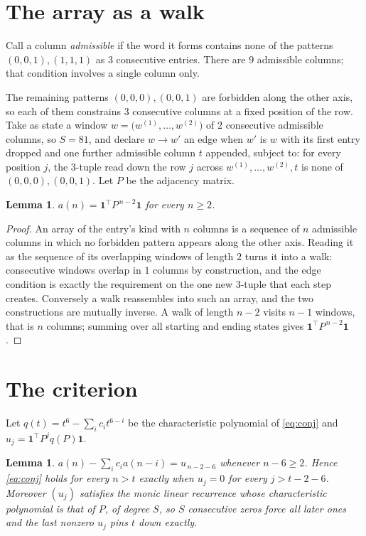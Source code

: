 \documentclass[11pt,a4paper]{article}
\theoremstyle{plain}
\newtheorem{lemma}[theorem]{Lemma}
\theoremstyle{definition}
\begin{document}
\section{The array as a walk}

Call a column \emph{admissible} if the word it forms contains none of the patterns
$(0,0,1), (1,1,1)$ as $3$ consecutive entries. There are $9$ admissible columns; that condition
involves a single column only.

The remaining patterns $(0,0,0), (0,0,1)$ are forbidden along the other axis, so each of them
constrains $3$ consecutive columns at a fixed position of the row. Take as state a
window $w=\bigl(w^{(1)},\dots,w^{(2)}\bigr)$ of $2$ consecutive admissible
columns, so $S=81$, and declare $w\to w'$ an edge when $w'$ is $w$ with its first entry
dropped and one further admissible column $t$ appended, subject to: for every position
$j$, the $3$-tuple read down the row $j$ across $w^{(1)},\dots,w^{(2)},t$
is none of $(0,0,0), (0,0,1)$. Let $P$ be the adjacency matrix.

\begin{lemma}\label{lem:walk}
$a(n)=\mathbf{1}^{\!\top}P^{\,n-2}\mathbf{1}$ for every $n\ge2$.
\end{lemma}

\begin{proof}
An array of the entry's kind with $n$ columns is a sequence of $n$ admissible columns in
which no forbidden pattern appears along the other axis. Reading it as the sequence of its
overlapping windows of length $2$ turns it into a walk: consecutive windows overlap in
$1$ columns by construction, and the edge condition is exactly the requirement on the one
new $3$-tuple that each step creates. Conversely a walk reassembles into such an array,
and the two constructions are mutually inverse. A walk of length $n-2$ visits $n-1$
windows, that is $n$ columns; summing over all starting and ending states gives
$\mathbf{1}^{\!\top}P^{\,n-2}\mathbf{1}$.
\end{proof}

\section{The criterion}

Let $q(t)=t^{6}-\sum_i c_i t^{6-i}$ be the characteristic polynomial of
\eqref{eq:conj} and $u_j=\mathbf{1}^{\!\top}P^{j}q(P)\mathbf{1}$.

\begin{lemma}\label{lem:crit}
$a(n)-\sum_i c_i a(n-i)=u_{\,n-2-6}$ whenever $n-6\ge2$. Hence
\eqref{eq:conj} holds for every $n>t$ exactly when $u_j=0$ for every
$j>t-2-6$. Moreover $(u_j)$ satisfies the monic linear recurrence whose
characteristic polynomial is that of $P$, of degree $S$, so $S$ consecutive zeros force all
later ones and the last nonzero $u_j$ pins $t$ down exactly.
\end{lemma}
\end{document}
